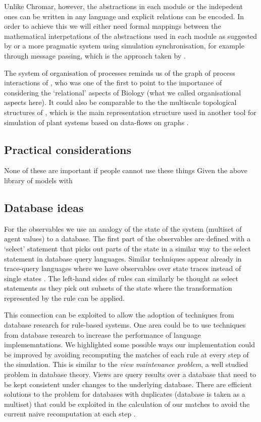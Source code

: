 \documentclass[phd]{infthesis}
\begin{document}
Unlike Chromar, however, the abstractions in each module or the indepedent ones
can be written in any language and explicit relations can be encoded. In order
to achieve this we will either need formal mappings between the mathematical
interpetations of the abstractions used in each module as suggested by
\citet{mjolsness_prospects_2018} or a more pragmatic system using simulation
synchronisation, for example through message passing, which is the approach
taken by \citet{cis_2018}.

The system of organisation of processes reminds us of the graph of process
interactions of \citet{rashevsky_topology_1954}, who was one of the first to
point to the importance of considering the `relational' aspects of Biology (what
we called organisational aspects here). It could also be comparable to the the
multiscale topological structures of \citet{godin_multiscale_1998}, which is the
main representation structure used in another tool for simulation of plant
systems based on data-flows on graphs
\citep[OpenAlea;][]{pradal_openalea:_2008}.

\subsection{Practical considerations}
None of these are important if people cannot use these things Given the above
library of models with

\subsection{Database ideas}
For the observables we use an analogy of the state of the system (multiset of
agent values) to a database. The first part of the observables are defined with
a `select' statement that picks out parts of the state in a similar way to the
select statement in database query languages. Similar techniques appear already
in trace-query languages where we have observables over state traces instead of
single states \citep{laurent_trace_2018}. The left-hand sides of rules can
similarly be thought as select statements as they pick out subsets of the state
where the transformation represented by the rule can be applied.

This connection can be exploited to allow the adoption of techniques from
database research for rule-based systems. One area could be to use techniques
from database research to increase the performance of language
implememntations. We highlighted some possible ways our implementation could be
improved by avoiding recomputing the matches of each rule at every step of the
simulation. This is similar to the \emph{view maintenance problem}, a well
studied problem in database theory. Views are query results over a database that
need to be kept consistent under changes to the underlying database. There are
efficient solutions to the problem for databases with duplicates (database is
taken as a multiset) that could be exploited in the calculation of our matches
to avoid the current naive recomputation at each step
\citep{griffin_incremental_1995}.
\end{document}

